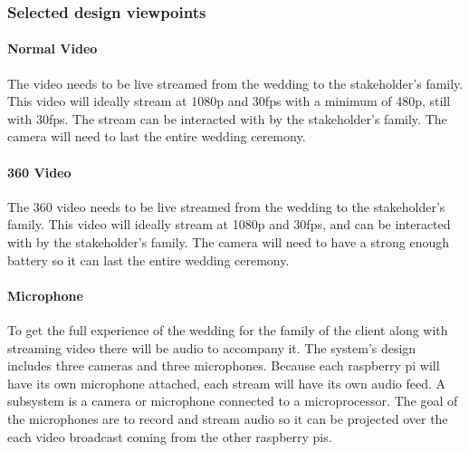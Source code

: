 \documentclass[onecolumn, draftclsnofoot,10pt, compsoc]{IEEEtran}
\begin{document}
    \subsubsection{Selected design viewpoints}
        \paragraph{Normal Video}
        The video needs to be live streamed from the wedding to the stakeholder's family.
        This video will ideally stream at 1080p and 30fps with a minimum of 480p, still with 30fps.
        The stream can be interacted with by the stakeholder's family.
        The camera will need to last the entire wedding ceremony.
        
        \paragraph{360 Video}
        The 360 video needs to be live streamed from the wedding to the stakeholder's family.
        This video will ideally stream at 1080p and 30fps, and can be interacted with by the stakeholder's family.
        The camera will need to have a strong enough battery so it can last the entire wedding ceremony.
        
        
        \paragraph{Microphone}
        To get the full experience of the wedding for the family of the client along with streaming video there will be audio to accompany it. The system’s design includes three cameras and three microphones. Because each raspberry pi will have its own microphone attached, each stream will have its own audio feed.  
        A subsystem is a camera or microphone connected to a microprocessor. 
        The goal of the microphones are to record and stream audio so it can be projected over the each video broadcast coming from the other raspberry pis. 
        
\end{document}
